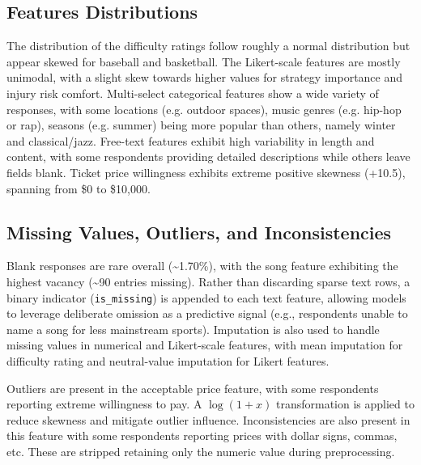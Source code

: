 \documentclass[12pt]{article}
\begin{document}
\subsection*{Features Distributions}
The distribution of the difficulty ratings follow roughly a normal distribution but appear skewed for baseball and basketball. The Likert-scale features are mostly unimodal, with a slight skew towards higher values for strategy importance and injury risk comfort. Multi-select categorical features show a wide variety of responses, with some locations (e.g. outdoor spaces), music genres (e.g. hip-hop or rap), seasons (e.g. summer) being more popular than others, namely winter and classical/jazz. Free-text features exhibit high variability in length and content, with some respondents providing detailed descriptions while others leave fields blank. Ticket price willingness exhibits extreme
positive skewness (+10.5), spanning from \$0 to \$10,000.


\subsection*{Missing Values, Outliers, and Inconsistencies}
Blank responses are rare overall (\textasciitilde 1.70\%), with the song feature exhibiting the highest vacancy (\textasciitilde 90 entries missing). Rather than discarding sparse text rows, a binary indicator (\texttt{is\_missing}) is appended to each text feature, allowing models to leverage deliberate omission as a predictive signal (e.g., respondents unable to name a song for less mainstream sports). Imputation is also used to handle missing values in numerical and Likert-scale features, with mean imputation for difficulty rating and neutral-value imputation for Likert features. 

Outliers are present in the acceptable price feature, with some respondents reporting extreme willingness to pay. A $\log(1+x)$ transformation is applied to reduce skewness and mitigate outlier influence. Inconsistencies are also present in this feature with some respondents reporting prices with dollar signs, commas, etc. These are stripped retaining only the numeric value during preprocessing. 
\end{document}
